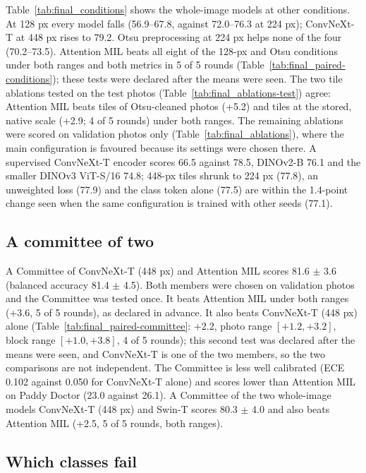 Table~\ref{tab:final_conditions} shows the whole-image models at other conditions. At 128 px every model falls (56.9--67.8,
against 72.0--76.3 at 224 px); ConvNeXt-T at 448 px rises to 79.2. Otsu preprocessing at 224 px helps none of the four
(70.2--73.5). Attention MIL beats all eight of the 128-px and Otsu conditions under both ranges and both metrics in 5 of 5
rounds (Table~\ref{tab:final_paired-conditions}); these tests were declared after the means were seen. The two tile ablations
tested on the test photos (Table~\ref{tab:final_ablations-test}) agree: Attention MIL beats tiles of Otsu-cleaned photos
(+5.2) and tiles at the stored, native scale (+2.9; 4 of 5 rounds) under both ranges. The remaining ablations
were scored on validation photos only (Table~\ref{tab:final_ablations}), where the main configuration is favoured because its
settings were chosen there. A supervised ConvNeXt-T encoder scores 66.5 against 78.5, DINOv2-B 76.1 and the smaller
DINOv3 ViT-S/16 74.8; 448-px tiles shrunk to 224 px (77.8), an unweighted loss (77.9) and the class token alone (77.5) are
within the 1.4-point change seen when the same configuration is trained with other seeds (77.1).

\subsection{A committee of two}
\label{sec:res:committee}
A Committee of ConvNeXt-T (448 px) and Attention MIL scores 81.6 $\pm$ 3.6 (balanced accuracy 81.4 $\pm$ 4.5). Both
members were chosen on validation photos and the Committee was tested once. It beats Attention MIL under both ranges (+3.6,
5 of 5 rounds), as declared in advance. It also beats ConvNeXt-T (448 px) alone (Table~\ref{tab:final_paired-committee}:
+2.2, photo range $[+1.2, +3.2]$, block range $[+1.0, +3.8]$, 4 of 5 rounds); this second test was declared after the means were seen, and ConvNeXt-T is one of the
two members, so the two comparisons are not independent. The Committee is less well calibrated (ECE 0.102 against 0.050
for ConvNeXt-T alone) and scores lower than Attention MIL on Paddy Doctor (23.0 against 26.1). A Committee of the two whole-image models
ConvNeXt-T (448 px) and Swin-T scores 80.3 $\pm$ 4.0 and also beats Attention MIL (+2.5, 5 of 5 rounds, both ranges).

\subsection{Which classes fail}
\label{sec:res:classes}

